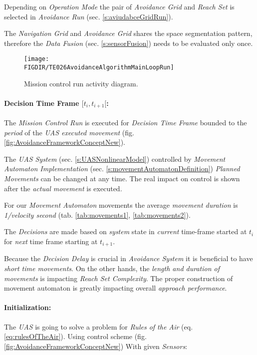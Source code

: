 \begin{note}
    Depending on \emph{Operation Mode} the pair of \emph{Avoidance Grid} and \emph{Reach Set} is selected in \emph{Avoidance Run} (sec. \ref{s:aviudabceGridRun}).
    
    
    The \emph{Navigation Grid} and \emph{Avoidance Grid} shares the space segmentation pattern, therefore the \emph{Data Fusion} (sec. \ref{s:sensorFusion}) needs to be evaluated only once. 
\end{note}

\begin{figure}[H]
    \centering
    \texttt{[image: \\FIGDIR/TE026AvoidanceAlgorithmMainLoopRun]}
    \caption{Mission control run activity diagram.}
    \label{fig:missionControlRunActivityDiagram}
\end{figure}

\paragraph{Decision Time Frame $[t_i,t_{i+1}[$:} The \emph{Mission Control Run} is executed for \emph{Decision Time Frame} bounded to the \emph{period} of the \emph{UAS executed movement} (fig. \ref{fig:AvoidanceFrameworkConceptNew}).

The \emph{UAS System} (sec. \ref{s:UASNonlinearModel}) controlled by \emph{Movement Automaton Implementation} (sec. \ref{s:movementAutomatonDefinition}) \emph{Planned Movements} can be changed at any time. The real impact on control is shown after the \emph{actual movement} is executed. 

For our \emph{Movement Automaton} movements the average \emph{movement duration} is \emph{1/velocity second} (tab. \ref{tab:movements1}, \ref{tab:movements2}).

The \emph{Decisions} are made based on \emph{system} state in \emph{current} time-frame started at $t_i$ for \emph{next} time frame starting at $t_{i+1}$.

\begin{note}
    Because the \emph{Decision Delay} is crucial in \emph{Avoidance System} it is beneficial to have \emph{short time movements}. On the other hands, the \emph{length and duration  of movements} is impacting \emph{Reach Set Complexity}. The proper construction of movement automaton is greatly impacting overall \emph{approach performance}.
\end{note}

\paragraph{Initialization:} The \emph{UAS} is going to solve a problem for \emph{Rules of the Air} (eq. \ref{eq:rulesOfTheAir}). Using control scheme (fig. \ref{fig:AvoidanceFrameworkConceptNew}) With given \emph{Sensors}:

